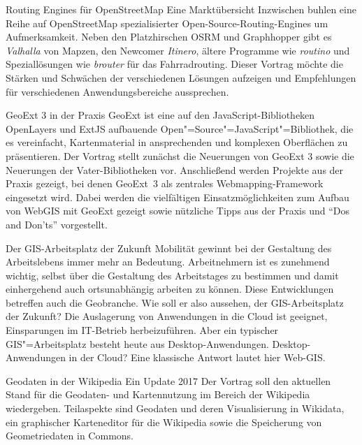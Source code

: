 %
{Routing Engines für OpenStreetMap}%
{Eine Marktübersicht}%
{Inzwischen buhlen eine Reihe auf OpenStreetMap spezialisierter Open-Source-Routing-Engines um
Aufmerksamkeit. Neben den Platzhirschen OSRM und Graphhopper gibt es \emph{Valhalla} von Mapzen, den
Newcomer \emph{Itinero}, ältere Programme wie \emph{routino} und Speziallösungen wie \emph{brouter} für das
Fahrradrouting. Dieser Vortrag möchte die Stärken und Schwächen der verschiedenen Lösungen aufzeigen
und Empfehlungen für verschiedenen Anwendungsbereiche aussprechen.}



%
{GeoExt 3 in der Praxis}%
{}%
{GeoExt ist eine auf den JavaScript-Bibliotheken Open\-Lay\-ers und ExtJS aufbauende
  Open"=Source"=JavaScript"=Bibliothek, die es vereinfacht, Kartenmaterial in ansprechenden und komplexen
  Oberflächen zu präsentieren.  Der Vortrag stellt zunächst die Neuerungen von GeoExt 3 sowie die
  Neuerungen der Vater-Bibliotheken
vor.  Anschließend werden Projekte aus der Praxis gezeigt, bei denen GeoExt~3 als zentrales
Webmapping-Framework eingesetzt wird. Dabei werden die vielfältigen Einsatzmöglichkeiten zum Aufbau
von WebGIS mit GeoExt gezeigt sowie nützliche Tipps aus der Praxis und "`Dos and Don'ts"'
vorgestellt.}

%
{Der GIS-Arbeitsplatz der Zukunft}%
{}%
{Mobilität gewinnt bei der Gestaltung des Arbeitslebens immer mehr an Bedeutung. Arbeitnehmern ist
es zunehmend wichtig, selbst über die Gestaltung des Arbeitstages zu bestimmen und damit
einhergehend auch ortsunabhängig arbeiten zu können. Diese Entwicklungen betreffen auch die
Geobranche. Wie soll er also aussehen, der GIS-Arbeitsplatz der Zukunft?  Die Auslagerung von
Anwendungen in die Cloud ist geeignet, Einsparungen im IT-Betrieb herbeizuführen. Aber ein typischer
GIS"=Arbeitsplatz besteht heute aus Desktop-Anwendungen. Desktop-Anwendungen in der Cloud? Eine
klassische Antwort lautet hier Web-GIS.}

%
{Geodaten in der Wikipedia}%
{Ein Update 2017}%
{Der Vortrag soll den aktuellen Stand für die Geodaten- und Kartennutzung im Bereich der Wikipedia
wiedergeben. Teilaspekte sind Geodaten und deren Visualisierung in Wikidata, ein graphischer
Karteneditor für die Wikipedia sowie die Speicherung von Geometriedaten in Commons.  }

\vspace{0.7\baselineskip}


